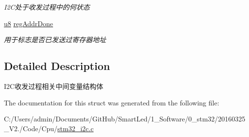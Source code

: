 \begin{DoxyCompactItemize}
\begin{DoxyCompactList}\small\item\em \-I2\-C处于收发过程中的何状态 \end{DoxyCompactList}\item 
\hypertarget{struct_s_t_r___i2c_proc_a0b23703dbeda0b854bd67455246415ad}{\hyperlink{group___b_s_p_gaed742c436da53c1080638ce6ef7d13de}{u8} \hyperlink{struct_s_t_r___i2c_proc_a0b23703dbeda0b854bd67455246415ad}{reg\-Addr\-Done}}\label{struct_s_t_r___i2c_proc_a0b23703dbeda0b854bd67455246415ad}

\begin{DoxyCompactList}\small\item\em 用于标志是否已发送过寄存器地址 \end{DoxyCompactList}\end{DoxyCompactItemize}


\subsection{\-Detailed \-Description}
\-I2\-C收发过程相关中间变量结构体 

\-The documentation for this struct was generated from the following file\-:\begin{DoxyCompactItemize}
\item 
\-C\-:/\-Users/admin/\-Documents/\-Git\-Hub/\-Smart\-Led/1\-\_\-\-Software/0\-\_\-stm32/20160325\-\_\-\-V2./\-Code/\-Cpu/\hyperlink{stm32__i2c_8c}{stm32\-\_\-i2c.\-c}\end{DoxyCompactItemize}
